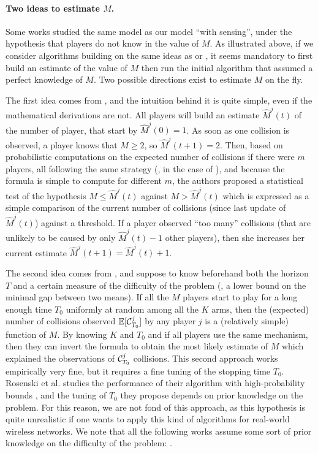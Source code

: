 \paragraph{Two ideas to estimate $M$.}

Some works studied the same model as our model \modeldeux{} ``with sensing'', under the hypothesis that players do not know in the value of $M$.
As illustrated above, if we consider algorithms building on the same ideas as \RhoRand{} or \MCTopM, it seems mandatory to first build an estimate of the value of $M$ then run the initial algorithm that assumed a perfect knowledge of $M$.
Two possible directions exist to estimate $M$ on the fly.

The first idea comes from \cite{Anandkumar11}, and the intuition behind it is quite simple, even if the mathematical derivations are not.
All players will build an estimate $\hat{M}^j(t)$ of the number of player, that start by $\hat{M}^j(0)=1$. As soon as one collision is observed, a player knows that $M\geq2$, so $\hat{M}^j(t+1) = 2$.
Then, based on probabilistic computations on the expected number of collisions if there were $m$ players, all following the same strategy (\eg, \RhoRand{} in the case of ), and because the formula is simple to compute for different $m$, the authors proposed a statistical test of the hypothesis $M \leq \hat{M}^j(t)$ against $M > \hat{M}^j(t)$ which is expressed as a simple comparison of the current number of collisions (since last update of $\hat{M}^j(t)$) against a threshold.
If a player observed ``too many'' collisions (that are unlikely to be caused by only $\hat{M}^j(t) - 1$ other players), then she increases her current estimate $\hat{M}^j(t+1) = \hat{M}^j(t) + 1$.

The second idea comes from \cite{Rosenski16}, and suppose to know beforehand both the horizon $T$ and a certain measure of the difficulty of the problem (\ie, a lower bound on the minimal gap between two means).
If all the $M$ players start to play for a long enough time $T_0$ uniformly at random among all the $K$ arms, then the (expected) number of collisions observed $\mathbb{E}[\mathcal{C}^j_{T_0}]$ by any player $j$ is a (relatively simple) function of $M$. By knowing $K$ and $T_0$ and if all players use the same mechanism, then they can invert the formula to obtain the most likely estimate of $M$ which explained the observations of $\mathcal{C}^j_{T_0}$ collisions.
This second approach works empirically very fine, but it requires a fine tuning of the stopping time $T_0$.
Rosenski et al. studies the performance of their algorithm with high-probability bounds \cite{Rosenski16}, and the tuning of $T_0$ they propose depends on prior knowledge on the problem.
%
For this reason, we are not fond of this approach, as this hypothesis is quite unrealistic if one wants to apply this kind of algorithms for real-world wireless networks.
We note that all the following works assume some sort of prior knowledge on the difficulty of the problem:
\cite{kumar2017channel,KumarYadav2018,SawantKumar2018,JoshiKumar2018,DarakHanawal18,KumarDarak2019,Tibrewal2019}.


